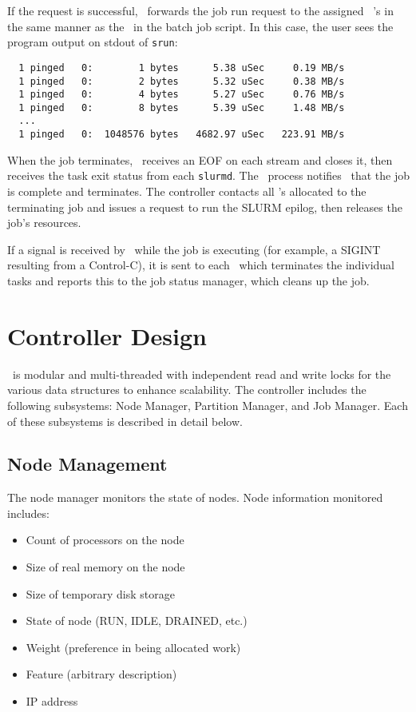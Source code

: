 If the request is successful, \srun\ forwards the job run request
to the assigned \slurmd~'s in the same manner as the \srun\ in the
batch job script. In this case, the user sees the program output on 
stdout of {\tt srun}:

\begin{verbatim}
  1 pinged   0:        1 bytes      5.38 uSec     0.19 MB/s                     
  1 pinged   0:        2 bytes      5.32 uSec     0.38 MB/s                     
  1 pinged   0:        4 bytes      5.27 uSec     0.76 MB/s                     
  1 pinged   0:        8 bytes      5.39 uSec     1.48 MB/s                     
  ...
  1 pinged   0:  1048576 bytes   4682.97 uSec   223.91 MB/s              
\end{verbatim}

When the job terminates, \srun\ receives an EOF on each stream and
closes it, then receives the task exit status from each {\tt slurmd}.
The \srun\ process notifies \slurmctld\ that the job is complete 
and terminates. The controller contacts all \slurmd 's allocated to the
terminating job and issues a request to run the SLURM epilog, then releases
the job's resources.

If a signal is received by \srun\ while the job is executing (for example,
a SIGINT resulting from a Control-C), it is sent to each \slurmd\ which 
terminates the individual tasks and reports this to the job status manager,
which cleans up the job.

\section{Controller Design}

\slurmctld\ is modular and multi-threaded with independent read
and write locks for the various data structures to enhance 
scalability.  
The controller includes the following subsystems:
Node Manager, Partition Manager, and Job Manager.
Each of these subsystems is described in detail below.

\subsection{Node Management}

The node manager monitors the state of nodes.  
Node information monitored includes:

\begin{itemize}
\item Count of processors on the node
\item Size of real memory on the node
\item Size of temporary disk storage
\item State of node (RUN, IDLE, DRAINED, etc.)
\item Weight (preference in being allocated work)
\item Feature (arbitrary description)
\item IP address
\end{itemize}

